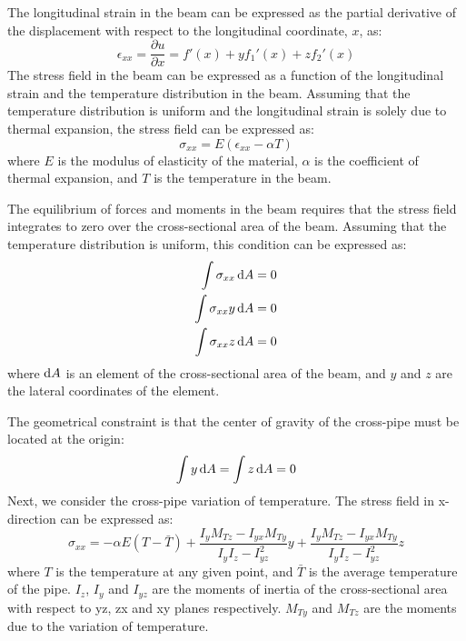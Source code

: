 The longitudinal strain in the beam can be expressed as the partial derivative of the displacement with respect to the longitudinal coordinate, $x$, as:
\begin{equation}
    \epsilon_{xx} = \frac{\partial u}{\partial x} = f'(x) + yf_1'(x) + zf_2'(x)
\end{equation}
The stress field in the beam can be expressed as a function of the longitudinal strain and the temperature distribution in the beam. Assuming that the temperature distribution is uniform and the longitudinal strain is solely due to thermal expansion, the stress field can be expressed as:
\begin{equation}
    \sigma_{xx} = E \left(\epsilon_{xx} - \alpha T\right)
\end{equation}
where $E$ is the modulus of elasticity of the material, $\alpha$ is the coefficient of thermal expansion, and $T$ is the temperature in the beam.

The equilibrium of forces and moments in the beam requires that the stress field integrates to zero over the cross-sectional area of the beam. Assuming that the temperature distribution is uniform, this condition can be expressed as:
\begin{align}
    \int \sigma_{xx} \dif A   & = 0 \\
    \int \sigma_{xx} y \dif A & = 0 \\
    \int \sigma_{xx} z \dif A & = 0
\end{align}
where $\dif A$ is an element of the cross-sectional area of the beam, and $y$ and $z$ are the lateral coordinates of the element.

The geometrical constraint is that the center of gravity of the cross-pipe must be located at the origin:
\begin{equation}
    \int y \dif A = \int z \dif A = 0
\end{equation}
Next, we consider the cross-pipe variation of temperature. The stress field in x-direction can be expressed as:
\begin{equation}
    \sigma_{xx} = -\alpha E\left(T - \bar{T}\right) + \frac{I_yM_{Tz}-I_{yx}M_{Ty}}{I_yI_z-I^2_{yz}}y + \frac{I_yM_{Tz}-I_{yx}M_{Ty}}{I_yI_z-I^2_{yz}}z
\end{equation}
where $T$ is the temperature at any given point, and $\bar{T}$ is the average temperature of the pipe. $I_z$, $I_y$ and $I_{yz}$ are the moments of inertia of the cross-sectional area with respect to yz, zx and xy planes respectively. $M_{Ty}$ and $M_{Tz}$ are the moments due to the variation of temperature.


